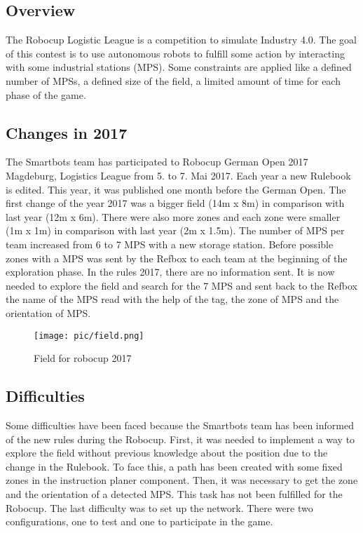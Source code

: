 \subsection{Overview}

The Robocup Logistic League is a competition to simulate Industry 4.0.  The goal of this contest is to use autonomous robots to fulfill some action by interacting with some industrial stations (MPS). Some constraints are applied like a defined number of MPSs, a defined size of the field, a limited amount of time for each phase of the game. 

\subsection{Changes in 2017}

The Smartbots team has participated to Robocup German Open 2017 Magdeburg, Logistics League from 5. to 7. Mai 2017. Each year a new Rulebook is edited. This year, it was published one month before the German Open. The first change of the year 2017 was a bigger field (14m x 8m) in comparison with last year (12m x 6m). There were also more zones and each zone were smaller (1m x 1m) in comparison with last year (2m x 1.5m). The number of MPS per team increased from 6 to 7 MPS with a new storage station. Before possible zones with a MPS was sent by the Refbox to each team at the beginning of the exploration phase. In the rules 2017, there are no information sent. It is now needed to explore the field and search for the 7 MPS and sent back to the Refbox the name of the MPS read with the help of the tag, the zone of MPS and the orientation of MPS. 

\begin{figure}%
\centering
\texttt{[image: pic/field.png]}
\caption{Field for robocup 2017}
\label{fig:frog}
\end{figure}

\subsection{Difficulties}

Some difficulties have been faced because the Smartbots team has been informed of the new rules during the Robocup. First, it was needed to implement a way to explore the field without previous knowledge about the position due to the change in the Rulebook. To face this, a path has been created with some fixed zones in the instruction planer component. Then, it was necessary to get the zone and the orientation of a detected MPS. This task has not been fulfilled for the Robocup. The last difficulty was to set up the network. There were two configurations, one to test and one to participate in the game.
 

